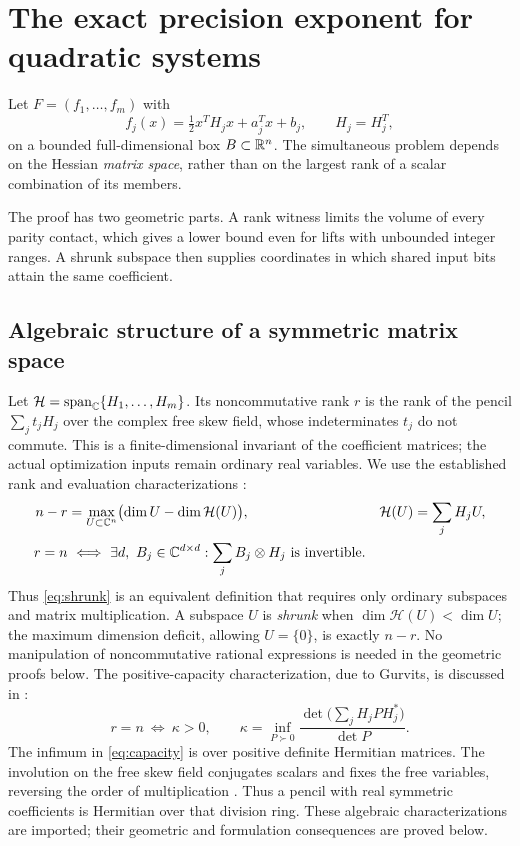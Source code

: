 \section{The exact precision exponent for quadratic systems}\label{sec:ncrank}

Let $F=(f_1,\ldots,f_m)$ with
\[
 f_j(x)=\tfrac12x^TH_jx+a_j^Tx+b_j,\qquad H_j=H_j^T,
\]
on a bounded full-dimensional box $B\subset\mathbb R^n$. The simultaneous
problem depends on the Hessian \emph{matrix space}, rather than on the
largest rank of a scalar combination of its members.

The proof has two geometric parts. A rank witness limits the volume of
every parity contact, which gives a lower bound even for lifts with
unbounded integer ranges. A shrunk subspace then supplies coordinates
in which shared input bits attain the same coefficient.

\subsection{Algebraic structure of a symmetric matrix space}

Let $\mathcal H=\operatorname{span}_{\mathbb C}\{H_1,\ldots,H_m\}$.
Its noncommutative rank $r$ is the rank of the pencil
$\sum_jt_jH_j$ over the complex free skew field, whose indeterminates
$t_j$ do not commute. This is a finite-dimensional invariant of the
coefficient matrices; the actual optimization inputs remain ordinary
real variables. We use the established rank and evaluation characterizations
\citep[Theorems 1.4 and 1.17]{ggow2020}:
\begin{align}
 n-r&=\max_{U\subset\C^n}
       \bigl(\dim U-\dim\mathcal H(U)\bigr),
 &\mathcal H(U)&=\sum_jH_jU,\label{eq:shrunk}\\
 r=n&\ \Longleftrightarrow\ 
 \exists d,\ B_j\in\C^{d\times d}:
       \sum_j B_j\otimes H_j\text{ is invertible}.\label{eq:evaluation}
\end{align}
Thus \eqref{eq:shrunk} is an equivalent definition that requires
only ordinary subspaces and matrix multiplication. A subspace $U$ is
\emph{shrunk} when $\dim\mathcal H(U)<\dim U$; the maximum dimension
deficit, allowing $U=\{0\}$, is exactly $n-r$. No manipulation of
noncommutative rational expressions is needed in the geometric proofs below.
The positive-capacity characterization, due to Gurvits, is discussed in
\citet[Section 1.5, concluding discussion on p.~237, and Section 2]{ggow2020}:
\begin{equation}\label{eq:capacity}
 r=n\ \Longleftrightarrow\ \kappa>0,
 \qquad\kappa=\inf_{P\succ0}
 \frac{\det\bigl(\sum_jH_jPH_j^*\bigr)}{\det P}.
\end{equation}
The infimum in \eqref{eq:capacity} is over positive definite Hermitian
matrices. The involution on the free skew field conjugates scalars and
fixes the free variables, reversing the order of multiplication
\citep[Section 2.1]{volcic2021}. Thus a pencil with real symmetric
coefficients is Hermitian over that division ring. These algebraic
characterizations are imported; their geometric and formulation
consequences are proved below.

